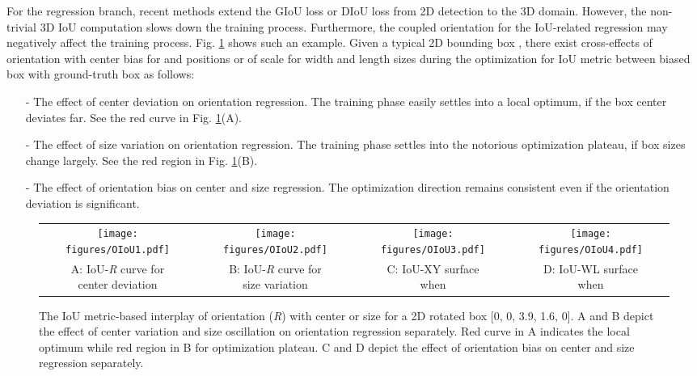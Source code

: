 \documentclass[runningheads]{llncs}
\begin{document}
For the regression branch, recent methods \cite{liang2021rangeioudet,zheng2021se} extend the GIoU \cite{rezatofighi2019generalized} loss or DIoU \cite{zheng2020distance} loss from 2D detection to the 3D domain. 
However, the non-trivial 3D IoU computation slows down the training process. Furthermore, the coupled orientation for the IoU-related regression may negatively affect the training process.
Fig. \ref{fig:orientation} shows such an example. Given a typical 2D bounding box , there exist cross-effects of orientation with center bias for  and  positions or of scale for width and length sizes during the optimization for IoU metric between biased box with ground-truth box as follows:
\begin{itemize}
\item[-] The effect of center deviation on orientation regression.  
The training phase easily settles into a local optimum, if the box center deviates far. See the red curve in Fig. \ref{fig:orientation}(A).
\item[-] The effect of size variation on orientation regression. 
The training phase settles into the notorious optimization plateau, if box sizes change largely. See the red region in Fig. \ref{fig:orientation}(B).
\item[-] The effect of orientation bias on center and size regression. The optimization direction remains consistent even if the orientation deviation is significant.
\end{itemize}
\begin{figure}[t]
\centering
\begin{tabular}{cccc}
\texttt{[image: figures/OIoU1.pdf]} & 
\texttt{[image: figures/OIoU2.pdf]} & 
\texttt{[image: figures/OIoU3.pdf]} & 
\texttt{[image: figures/OIoU4.pdf]} \\
\makecell{A: IoU-\textit{R} curve for \\ center deviation} & 
\makecell{B: IoU-\textit{R} curve for \\ size variation} &
\makecell{C: IoU-XY surface \\ when } & 
\makecell{D: IoU-WL surface \\ when } \\
\end{tabular}
\caption{The IoU metric-based interplay of orientation (\textit{R}) with center or size for a 2D rotated box [0, 0, 3.9, 1.6, 0]. A and B depict the effect of center variation and size oscillation on orientation regression separately. Red curve in A indicates the local optimum while red region in B for optimization plateau.
C and D depict the effect of orientation bias  on center and size regression separately.}
\label{fig:orientation}
\end{figure}
\end{document}
